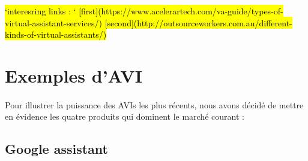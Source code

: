
\hl{
	`interesring links : `
	[first](https://www.acelerartech.com/va-guide/types-of-virtual-assistant-services/)
	[second](http://outsourceworkers.com.au/different-kinds-of-virtual-assistants/)}


\newpage
\section{Exemples d'AVI}
\paragraph{}
Pour illustrer la puissance des AVIs les plus récents, nous avons décidé de mettre en évidence les quatre produits qui dominent le marché courant :

\subsection*{Google assistant}
